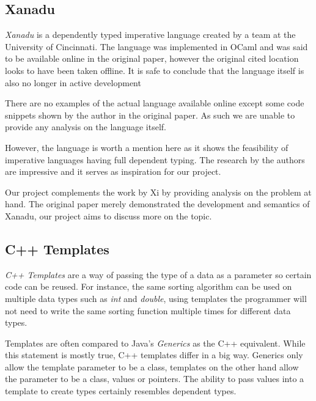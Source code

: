 \documentclass[a4paper,12pt]{report}
\begin{document}
\subsection{Xanadu}
\textit{Xanadu} \cite{xanadu} is a dependently typed imperative language created by a team at 
the University of Cincinnati. The language was implemented in OCaml and was 
said to be available online in the original paper, however the original cited 
location looks to have been taken offline. It is safe to conclude that 
the language itself is also no longer in active development 

\par
There are no examples of the actual language available online except some code 
snippets shown by the author in the original paper. As such we are unable to 
provide any analysis on the language itself.

\par
However, the language is worth a mention here as it shows the feasibility of 
imperative languages having full dependent typing. The research by the authors 
are impressive and it serves as inspiration for our project. 

\par
Our project complements the work by Xi by providing analysis on the problem at 
hand. The original paper merely demonstrated the development and semantics of 
Xanadu, our project aims to discuss more on the topic. 

\subsection{C++ Templates}
\textit{C++ Templates} \cite{cppTemplate} are a way of passing the type of a 
data as a parameter so certain code can be reused. For instance, the same 
sorting algorithm can be used on multiple data types such as \textit{int} and 
\textit{double}, using templates the programmer will not need to write the same 
sorting function multiple times for different data types. 

\par
Templates are often compared to Java's \textit{Generics} \cite{javaGenerics} 
as the C++ equivalent. While this statement is mostly true, C++ templates 
differ in a big way. 
Generics only allow the template parameter to be a class, templates on the other 
hand allow the parameter to be a class, values or pointers. The ability to 
pass values into a template to create types certainly resembles dependent types.
\end{document}
